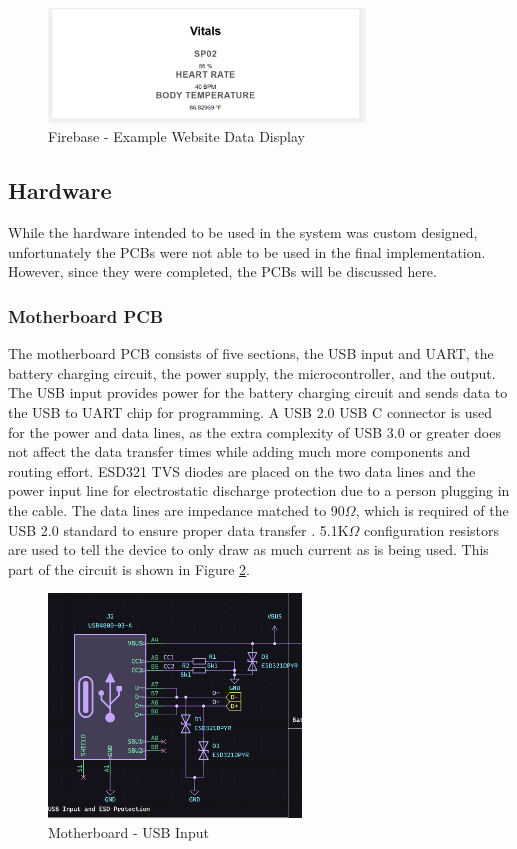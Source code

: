 \documentclass[12pt]{article}
\begin{document}
    \begin{figure}[hbt!]
        \centering
        \includegraphics[width=0.75\textwidth]{images/fb_data.png}
        \caption{Firebase - Example Website Data Display}
        \label{fb_data}
    \end{figure} 

\subsection{Hardware}
    While the hardware intended to be used in the system was custom designed, unfortunately the PCBs were not able to be used in the final implementation. However, since they were completed, the PCBs will be discussed here.

\subsubsection{Motherboard PCB}
    The motherboard PCB consists of five sections, the USB input and UART, the battery charging circuit, the power supply, the microcontroller, and the output. The USB input provides power for the battery charging circuit and sends data to the USB to UART chip for programming. A USB 2.0 USB C connector is used for the power and data lines, as the extra complexity of USB 3.0 or greater does not affect the data transfer times while adding much more components and routing effort. ESD321 TVS diodes are placed on the two data lines and the power input line for electrostatic discharge protection due to a person plugging in the cable. The data lines are impedance matched to 90$\Omega$, which is required of the USB 2.0 standard to ensure proper data transfer \cite{usb_spec}. 5.1K$\Omega$ configuration resistors are used to tell the device to only draw as much current as is being used. This part of the circuit is shown in Figure \ref{pcb_usb}.

    \begin{figure}[hbt!]
        \centering
        \includegraphics[width=0.6\textwidth]{images/pcb_usb.png}
        \caption{Motherboard - USB Input}
        \label{pcb_usb}
    \end{figure}
\end{document}
